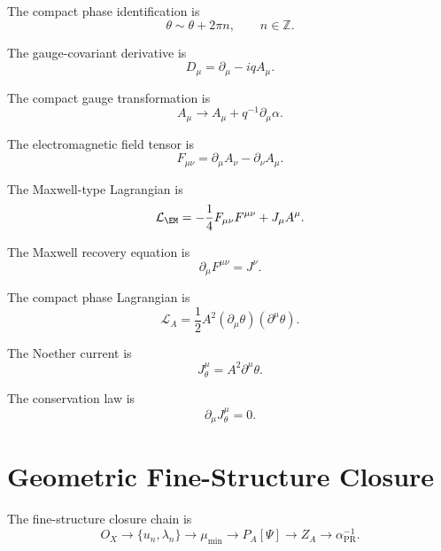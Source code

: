 \documentclass[11pt]{article}
\newcommand{\PR}{\mathrm{PR}}
\begin{document}
The compact phase identification is
\begin{equation}
\boxed{
\theta\sim\theta+2\pi n,
\qquad
n\in\mathbb Z.
}
\end{equation}

The gauge-covariant derivative is
\begin{equation}
\boxed{
D_\mu=\partial_\mu-iqA_\mu.
}
\end{equation}

The compact gauge transformation is
\begin{equation}
\boxed{
A_\mu\rightarrow A_\mu+q^{-1}\partial_\mu\alpha.
}
\end{equation}

The electromagnetic field tensor is
\begin{equation}
\boxed{
F_{\mu\nu}
=
\partial_\mu A_\nu-\partial_\nu A_\mu.
}
\end{equation}

The Maxwell-type Lagrangian is
\begin{equation}
\mathcal L_{\EM}
=
-\frac14F_{\mu\nu}F^{\mu\nu}
+
J_\mu A^\mu.
\end{equation}

The Maxwell recovery equation is
\begin{equation}
\boxed{
\partial_\mu F^{\mu\nu}=J^\nu.
}
\end{equation}

The compact phase Lagrangian is
\begin{equation}
\mathcal L_A
=
\frac12A^2(\partial_\mu\theta)(\partial^\mu\theta).
\end{equation}

The Noether current is
\begin{equation}
\boxed{
J_\theta^\mu=A^2\partial^\mu\theta.
}
\end{equation}

The conservation law is
\begin{equation}
\boxed{
\partial_\mu J_\theta^\mu=0.
}
\end{equation}


\section{Geometric Fine-Structure Closure}

The fine-structure closure chain is
\begin{equation}
\boxed{
O_X
\rightarrow
\{u_n,\lambda_n\}
\rightarrow
\mu_{\min}
\rightarrow
P_A[\Psi]
\rightarrow
Z_A
\rightarrow
\alpha_{\PR}^{-1}.
}
\end{equation}
\end{document}
